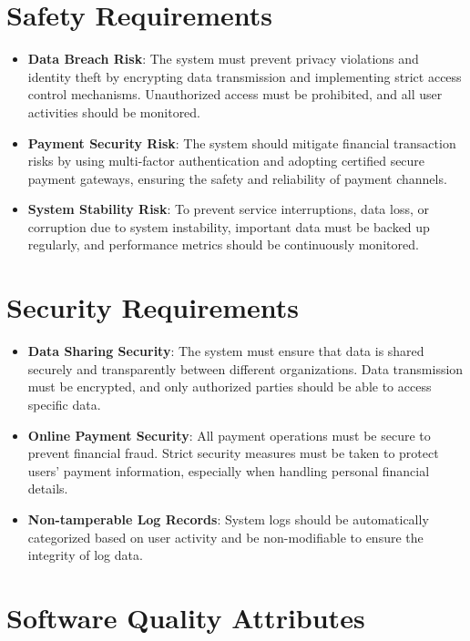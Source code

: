 \section{Safety Requirements}
\begin{itemize}
    \item \textbf{Data Breach Risk}: The system must prevent privacy violations and identity theft by encrypting data transmission and implementing strict access control mechanisms. Unauthorized access must be prohibited, and all user activities should be monitored.
    \item \textbf{Payment Security Risk}: The system should mitigate financial transaction risks by using multi-factor authentication and adopting certified secure payment gateways, ensuring the safety and reliability of payment channels.
    \item \textbf{System Stability Risk}: To prevent service interruptions, data loss, or corruption due to system instability, important data must be backed up regularly, and performance metrics should be continuously monitored.
\end{itemize}

\section{Security Requirements}
\begin{itemize}
    \item \textbf{Data Sharing Security}: The system must ensure that data is shared securely and transparently between different organizations. Data transmission must be encrypted, and only authorized parties should be able to access specific data.
    \item \textbf{Online Payment Security}: All payment operations must be secure to prevent financial fraud. Strict security measures must be taken to protect users' payment information, especially when handling personal financial details.
    \item \textbf{Non-tamperable Log Records}: System logs should be automatically categorized based on user activity and be non-modifiable to ensure the integrity of log data.
\end{itemize}

\section{Software Quality Attributes}
